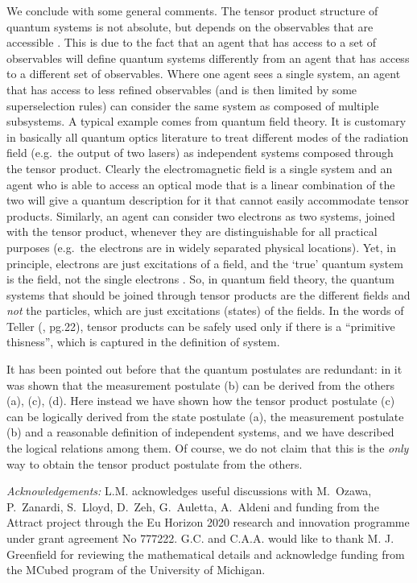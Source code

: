 \documentclass[aps,prl,amsmath,amssymb,twocolumn,nofootinbib]{revtex4}
\theoremstyle{plain}
\theoremstyle{definition}
\theoremstyle{remark}
\begin{document}
	We conclude with some general comments. The tensor product structure
	of quantum systems is not absolute, but depends on the observables
	that are accessible \cite{zanardi,zanardilloyd}. This is due to the
	fact that an agent that has access to a set of observables will define
	quantum systems differently from an agent that has access to a
	different set of observables. Where one agent sees a single system, an
	agent that has access to less refined observables (and is then limited
	by some superselection rules) can consider the same system as composed
	of multiple subsystems. A typical example \cite{tellerbook} comes from
	quantum field theory. It is customary in basically all quantum optics
	literature to treat different modes of the radiation field (e.g.~the
	output of two lasers) as independent systems composed through the
	tensor product.  Clearly the electromagnetic field is a single system
	and an agent who is able to access an optical mode that is a linear
	combination of the two will give a quantum description for it that
	cannot easily accommodate tensor products. Similarly, an agent can
	consider two electrons as two systems, joined with the tensor product,
	whenever they are distinguishable for all practical purposes (e.g.~the
	electrons are in widely separated physical locations). Yet, in
	principle, electrons are just excitations of a field, and the `true'
	quantum system is the field, not the single electrons
	\cite{teller,tellerbook}.  So, in quantum field theory, the quantum
	systems that should be joined through tensor products are the
	different fields and {\em not} the particles, which are just
	excitations (states) of the fields. In the words of Teller
	(\cite{tellerbook}, pg.22), tensor products can be safely used only if
	there is a ``primitive thisness'', which is captured in the definition
	of system.
	
	
	It has been pointed out before that the quantum postulates are
	redundant: in \cite{masanes,hartle} it was shown that the measurement
	postulate (b) can be derived from the others (a), (c), (d). Here
	instead we have shown how the tensor product postulate (c) can be
	logically derived from the state postulate (a), the measurement
	postulate (b) and a reasonable definition of independent systems, and
	we have described the logical relations among them.  Of course, we do
	not claim that this is the {\em only} way to obtain the tensor product
	postulate from the others.
	
	{\it Acknowledgements:} L.M. acknowledges useful discussions with
	M.~Ozawa, P.~Zanardi, S.~Lloyd, D.~Zeh, G.~Auletta, A.~Aldeni and
	funding from the Attract project through the Eu Horizon 2020 research
	and innovation programme under grant agreement No 777222. G.C. and C.A.A. would like to thank M. J. Greenfield for reviewing the mathematical details and acknowledge funding from the MCubed program of the University
	of Michigan.
	
\end{document}
